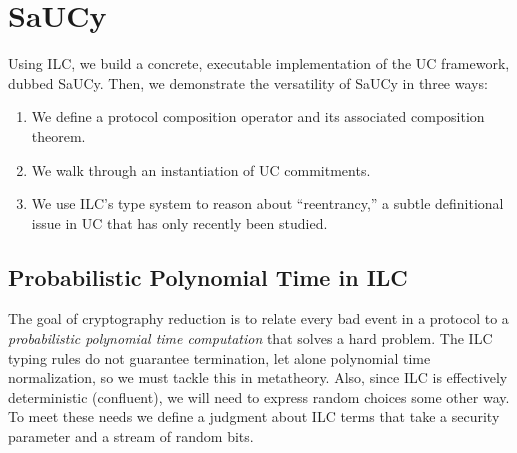\section{SaUCy}
\label{sec:saucy}

Using ILC, we build a concrete, executable implementation of the UC framework,
dubbed SaUCy. Then, we demonstrate the versatility of SaUCy in three ways:
\begin{enumerate}[leftmargin=*]
\item We define a protocol composition operator and its associated composition theorem.
\item We walk through an instantiation of UC commitments.
\item We use ILC's type system to reason about ``reentrancy,'' a subtle definitional issue in UC that has only recently been studied.
\end{enumerate}


\subsection{Probabilistic Polynomial Time in ILC}
\label{subsec:ppt}
The goal of cryptography reduction is to relate every bad event in a protocol to a \emph{probabilistic polynomial time computation} that solves a hard problem.
The ILC typing rules do not guarantee termination, let alone polynomial time normalization, so we must tackle this in metatheory.
Also, since ILC is effectively deterministic (confluent), we will need to express random choices some other way.
To meet these needs we define a judgment about ILC terms that take a security parameter and a  stream of random bits.

